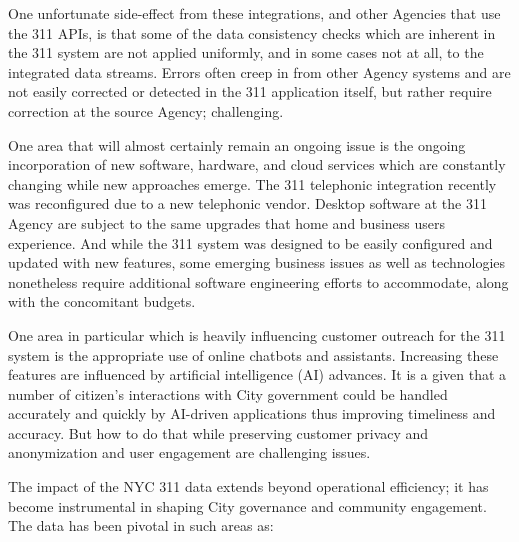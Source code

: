 \documentclass[12pt, titlepage]{article}
\begin{document}
One unfortunate side-effect from these integrations, and other Agencies that use the 311 APIs, is that some of the data consistency
checks which are inherent in the 311 system are not applied uniformly, and in some cases not at all, to the integrated data streams.
Errors often creep in from other Agency systems and are not easily corrected or detected in the 311 application itself,
but rather require correction at the source Agency; challenging.

One area that will almost certainly remain an ongoing issue is the ongoing incorporation of new software, hardware,
and cloud services which are constantly changing while new approaches emerge. The 311 telephonic integration recently was reconfigured due to a new
telephonic vendor. Desktop software at the 311 Agency are subject to the same upgrades that home and business users experience. And while the 
311 system was designed to be easily configured and updated with new features, some emerging business issues as well as
technologies nonetheless require additional software engineering efforts to accommodate, along with the concomitant budgets.

One area in particular which is heavily influencing customer outreach for the 311 system is the appropriate use of
online chatbots and assistants. Increasing these features are influenced by artificial intelligence (AI) advances. It is a given that
a number of citizen's interactions with City government could be handled accurately and quickly by AI-driven
applications thus improving timeliness and accuracy. But how to do that while preserving customer privacy and anonymization
and user engagement are challenging issues. 	

The impact of the NYC 311 data extends beyond operational efficiency;
it has become instrumental in shaping City governance and community
engagement. The data has been pivotal in such areas as:
\end{document}
